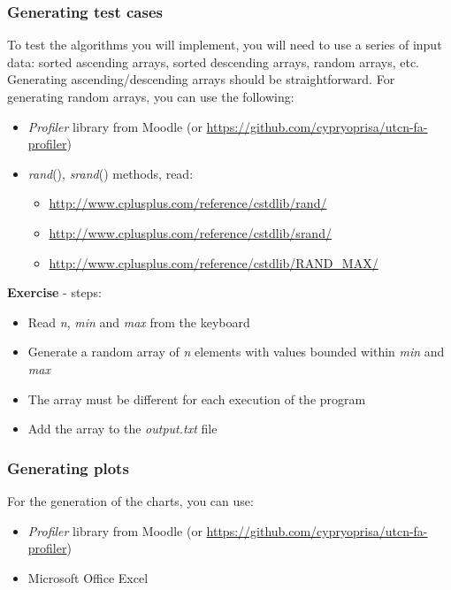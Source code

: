\documentclass[../en-fa-lab.tex]{subfiles}
\begin{document}
\subsubsection{Generating test cases}\label{generare-cazuri-de-testare}

To test the algorithms you will implement, you will need to use a series
of input data: sorted ascending arrays, sorted descending arrays, random
arrays, etc. Generating ascending/descending arrays should be
straightforward. For generating random arrays, you can use the
following:

\begin{itemize}
\item
  \emph{Profiler} library from Moodle (or
  \url{https://github.com/cypryoprisa/utcn-fa-profiler})
\item
  \emph{rand}(), \emph{srand}() methods, read:

  \begin{itemize}
  \item
    \url{http://www.cplusplus.com/reference/cstdlib/rand/}
  \item
    \url{http://www.cplusplus.com/reference/cstdlib/srand/}
  \item
    \url{http://www.cplusplus.com/reference/cstdlib/RAND_MAX/}
  \end{itemize}
\end{itemize}

\textbf{Exercise} - steps:

\begin{itemize}
\item
  Read \emph{n}, \emph{min} and \emph{max} from the keyboard
\item
  Generate a random array of \emph{n} elements with values bounded
  within \emph{min} and \emph{max}
\item
  The array must be different for each execution of the program
\item
  Add the array to the \emph{output.txt} file
\end{itemize}

\subsubsection{Generating plots}\label{generare-grafice}

For the generation of the charts, you can use:

\begin{itemize}
\item
  \emph{Profiler} library from Moodle (or
  \url{https://github.com/cypryoprisa/utcn-fa-profiler})
\item
  Microsoft Office Excel
\end{itemize}
\end{document}
